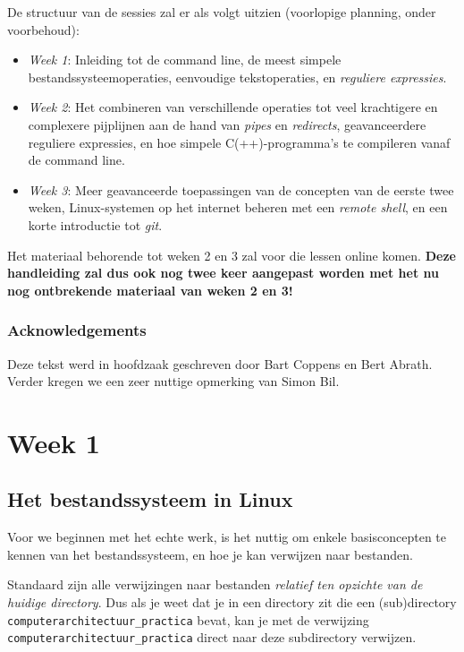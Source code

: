 \documentclass[a4paper,twoside,openany]{memoir}
\begin{document}
De structuur van de sessies zal er als volgt uitzien (voorlopige planning, onder voorbehoud):

\begin{itemize}

  \item \emph{Week 1}: Inleiding tot de command line, de meest simpele
    bestandssysteemoperaties, eenvoudige tekstoperaties, en \emph{reguliere
    expressies}.

  \item \emph{Week 2}: Het combineren van verschillende operaties tot veel
    krachtigere en complexere pijplijnen aan de hand van \emph{pipes} en
    \emph{redirects}, geavanceerdere reguliere expressies, en hoe simpele
    C(++)-programma's te compileren vanaf de command line.

  \item \emph{Week 3}: Meer geavanceerde toepassingen van de concepten van de
    eerste twee weken, Linux-systemen op het internet beheren met een
    \emph{remote shell}, en een korte introductie tot \emph{git}.

\end{itemize}

Het materiaal behorende tot weken 2 en 3 zal voor die lessen online komen.
\textbf{Deze handleiding zal dus ook nog twee keer aangepast worden met het nu
nog ontbrekende materiaal van weken 2 en 3!}

\section{Acknowledgements}
Deze tekst werd in hoofdzaak geschreven door Bart Coppens en Bert Abrath. Verder
kregen we een zeer nuttige opmerking van Simon Bil.

\part{Week 1}
\chapter{Het bestandssysteem in Linux}
Voor we beginnen met het echte werk, is het nuttig om enkele basisconcepten
te kennen van het bestandssysteem, en hoe je kan verwijzen naar bestanden.

Standaard zijn alle verwijzingen naar bestanden \emph{relatief ten opzichte van
de huidige directory}. Dus als je weet dat je in een directory zit die een
(sub)directory \verb!computerarchitectuur_practica! bevat, kan
je met de verwijzing \verb!computerarchitectuur_practica! direct naar deze
subdirectory verwijzen.
\end{document}
